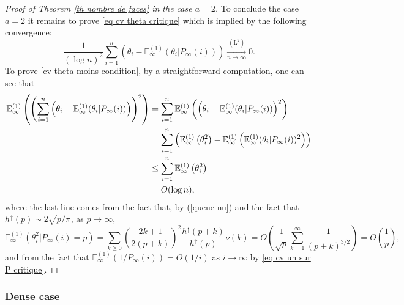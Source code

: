 \documentclass[11pt]{article}
\numberwithin{equation}{section}
\def\E{\mathbb{E}}
\begin{document}
\begin{proof}[Proof of Theorem \ref{th nombre de faces} in the case $a=2$]
To conclude the case $a=2$ it remains to prove \eqref{eq cv theta critique} which is implied by the following convergence:
\begin{equation}\label{cv theta moins condition}
\frac{1}{(\log n)^2}\sum_{i=1}^n \left( \theta_i -\E^{(1)}_\infty(\theta_i \vert P_\infty(i))\right)
\mathop{\longrightarrow}\limits_{n\to \infty}^{(\mathrm{L}^2)}
0.
\end{equation}
To prove \eqref{cv theta moins condition}, by a straightforward computation, one can see that
\begin{align}
\E^{(1)}_\infty \left(
\left(\sum_{i=1}^n \left(
\theta_i-\E^{(1)}_\infty(\theta_i \vert P_\infty(i))
\right)
\right)^2
\right) &=
\sum_{i=1}^n
\E^{(1)}_\infty \left(
\left(
\theta_i-\E^{(1)}_\infty(\theta_i \vert P_\infty(i))
\right)^2
\right) \notag \\
&=
\sum_{i=1}^n
\left(
\E^{(1)}_\infty \left(
\theta_i^2 \right)
-
\E^{(1)}_\infty\left(
\E^{(1)}_\infty(\theta_i \vert P_\infty(i))^2
\right)
\right)  \notag \\
&\le 
\sum_{i=1}^n
\E^{(1)}_\infty \left(
\theta_i^2 \right) \label{carre martingale theta}
\\
&= O(\log n), \notag
\end{align}
where the last line comes from the fact that, by (\ref{queue nu}) and the fact that $h^\uparrow(p) \sim 2\sqrt{p/\pi}$, as $p\to \infty$,
$$
\E^{(1)}_\infty (\theta_i^2| P_\infty(i)=p)
= \sum_{k\ge 0} \left(\frac{2k+1}{2(p+k)}\right)^2 \frac{h^\uparrow(p+k)}{h^\uparrow(p)} \nu(k)
= O \left( \frac{1}{\sqrt{p}} \sum_{k=1}^\infty \frac{1}{(p+k)^{3/2}} \right)
=O\left(\frac{1}{p} \right),
$$
and from the fact that $\E^{(1)}_\infty (1/P_\infty(i)) = O(1/i)$ as $i\to \infty$ by \eqref{eq cv un sur P critique}.
\end{proof}
\subsubsection{Dense case}
\end{document}
